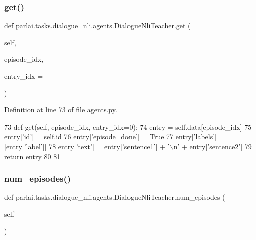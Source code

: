 \subsubsection{\texorpdfstring{get()}{get()}}
{\footnotesize\ttfamily def parlai.\+tasks.\+dialogue\+\_\+nli.\+agents.\+Dialogue\+Nli\+Teacher.\+get (\begin{DoxyParamCaption}\item[{}]{self,  }\item[{}]{episode\+\_\+idx,  }\item[{}]{entry\+\_\+idx = {} }\end{DoxyParamCaption})}



Definition at line 73 of file agents.\+py.


\begin{DoxyCode}
73     \textcolor{keyword}{def }get(self, episode\_idx, entry\_idx=0):
74         entry = self.data[episode\_idx]
75         entry[\textcolor{stringliteral}{'id'}] = self.id
76         entry[\textcolor{stringliteral}{'episode\_done'}] = \textcolor{keyword}{True}
77         entry[\textcolor{stringliteral}{'labels'}] = [entry[\textcolor{stringliteral}{'label'}]]
78         entry[\textcolor{stringliteral}{'text'}] = entry[\textcolor{stringliteral}{'sentence1'}] + \textcolor{stringliteral}{'\(\backslash\)n'} + entry[\textcolor{stringliteral}{'sentence2'}]
79         \textcolor{keywordflow}{return} entry
80 
81 
\end{DoxyCode}
\mbox{\label{classparlai_1_1tasks_1_1dialogue__nli_1_1agents_1_1DialogueNliTeacher_a1277b756af5d3ca234c77526a7bfb5e2}} 
\subsubsection{\texorpdfstring{num\+\_\+episodes()}{num\_episodes()}}
{\footnotesize\ttfamily def parlai.\+tasks.\+dialogue\+\_\+nli.\+agents.\+Dialogue\+Nli\+Teacher.\+num\+\_\+episodes (\begin{DoxyParamCaption}\item[{}]{self }\end{DoxyParamCaption})}



